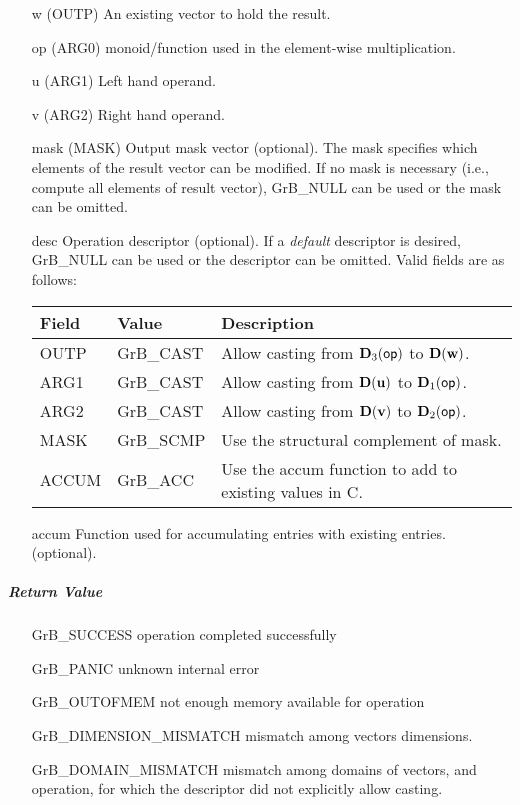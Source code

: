 \begin{itemize}[leftmargin=1.1in]
    \item[{\sf w}]     ({\sf OUTP}) An existing vector to hold the result.
    \item[{\sf op}]    ({\sf ARG0}) monoid/function used in the element-wise multiplication.
    \item[{\sf u}]     ({\sf ARG1}) Left hand operand.
    \item[{\sf v}]     ({\sf ARG2}) Right hand operand.

    \item[{\sf mask}] ({\sf MASK}) Output mask vector (optional). The mask
    specifies which elements of the result vector can be modified.
    If no mask is necessary (i.e., compute all elements of result
    vector), {\sf GrB\_NULL} can be used or the mask can be omitted.

    \item[{\sf desc}]  Operation descriptor (optional). If a
    \emph{default} descriptor is desired, {\sf GrB\_NULL} can be
    used or the descriptor can be omitted. Valid fields are as follows: \\
    \begin{tabular}{lll}
    Field  & Value & Description \\
    \hline
    {\sf OUTP} & {\sf GrB\_CAST} & Allow casting from $\bold{D}_3({\sf op})$ to $\bold{D}({\bf w})$. \\
    {\sf ARG1} & {\sf GrB\_CAST} & Allow casting from $\bold{D}({\bf u})$ to $\bold{D}_1({\sf op})$. \\
    {\sf ARG2} & {\sf GrB\_CAST} & Allow casting from $\bold{D}({\bf v})$ to $\bold{D}_2({\sf op})$. \\
    {\sf MASK} & {\sf GrB\_SCMP} & Use the structural complement of {\sf mask}. \\
    {\sf ACCUM}& {\sf GrB\_ACC}  & Use the {\sf accum} function to add to existing values in {\sf C}.\\
    \end{tabular}

  	\item[{\sf accum}]  Function used for accumulating entries with existing  entries. (optional).
\end{itemize}

\subparagraph{Return Value}

\begin{itemize}[leftmargin=2.1in]
\item[{\sf GrB\_SUCCESS}]             operation completed successfully
\item[{\sf GrB\_PANIC}]               unknown internal error
\item[{\sf GrB\_OUTOFMEM}]            not enough memory available for operation
\item[{\sf GrB\_DIMENSION\_MISMATCH}] mismatch among vectors dimensions.
\item[{\sf GrB\_DOMAIN\_MISMATCH}]    mismatch among domains of vectors, and operation, for which the descriptor did not explicitly allow casting.
\end{itemize}


